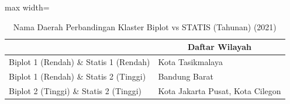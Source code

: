 \begin{table}[H]
\centering
\caption{Nama Daerah Perbandingan Klaster Biplot vs STATIS (Tahunan) (2021)} \label{tab:sample1biplot_statis_comp_name_2021}
\begin{adjustbox}{max width=\textwidth}
\begin{tabular}{|>{\centering\arraybackslash}p{4cm}|p{10cm}|}
\hline
\multicolumn{1}{|c|}{\textbf{Kategori}} & \multicolumn{1}{c|}{\textbf{Daftar Wilayah}} \\
\hline
Biplot 1 (Rendah) \& Statis 1 (Rendah) & Kota Tasikmalaya \\
\hline
Biplot 1 (Rendah) \& Statis 2 (Tinggi) & Bandung Barat \\
\hline
Biplot 2 (Tinggi) \& Statis 2 (Tinggi) & Kota Jakarta Pusat, Kota Cilegon \\
\hline
\end{tabular}
\end{adjustbox}
\end{table}